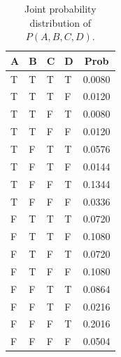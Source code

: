 \documentclass[12pt]{article}
\begin{document}
\begin{table}[!h]
	\centering
	\begin{tabular}{llllc}
		\toprule
		A & B & C & D & Prob   \\
		\midrule
		T & T & T & T & 0.0080 \\
		T & T & T & F & 0.0120 \\
		T & T & F & T & 0.0080 \\
		T & T & F & F & 0.0120 \\
		T & F & T & T & 0.0576 \\
		T & F & T & F & 0.0144 \\
		T & F & F & T & 0.1344 \\
		T & F & F & F & 0.0336 \\
		F & T & T & T & 0.0720 \\
		F & T & T & F & 0.1080 \\
		F & T & F & T & 0.0720 \\
		F & T & F & F & 0.1080 \\
		F & F & T & T & 0.0864 \\
		F & F & T & F & 0.0216 \\
		F & F & F & T & 0.2016 \\
		F & F & F & F & 0.0504 \\
		\bottomrule
		\hline
	\end{tabular}
	\caption{Joint probability distribution of $P(A, B, C, D)$.}
	\label{tab:joint_distribution}
\end{table}
\end{document}
